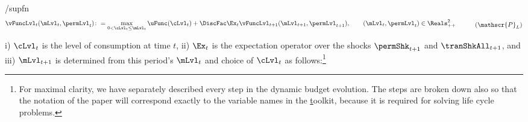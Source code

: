 \documentclass[\econtexRoot/BufferStockTheory]{subfiles}
\begin{document}
%
\begin{verbatimwrite}{\EqDir/supfn}
  \begin{equation}\begin{gathered}\begin{aligned}\label{eq:levelRecProblem}
    \vFuncLvl_{t}(\mLvl_{t}, \permLvl_{t})\colon & = \max_{0 < \cLvl_{t} \leq \mLvl_{t}} \uFunc(\cLvl_{t}) + \DiscFac \Ex_{t}\vFuncLvl_{t+1}(\mLvl_{t+1}, \permLvl_{t+1}), \qquad (\mLvl_{t}, \permLvl_{t})\in \Reals_{++}^{2} 
  \end{aligned}\end{gathered}
\tag{$\mathscr{P}_{L}$}
\end{equation}
\end{verbatimwrite} \unskip

 i) $\cLvl_{t}$ is the level of consumption at time $t$, ii) $\Ex_{t}$ is the expectation operator over the shocks $\permShk_{t+1}$ and $\tranShkAll_{t+1}$\hypertarget{checkRestrictions}{}\hypertarget{DBCparts}{}, and iii) $\mLvl_{t+1}$ is determined from this period's $\mLvl_{t}$ and choice of $\cLvl_{t}$ as follows:\footnote{For maximal clarity, we have separately described every step in the dynamic budget evolution.
The steps are broken down also so that the notation of the paper will correspond exactly to the variable names in the \href{https://github.com/econ-ark/HARK} toolkit, because it is required for solving life cycle problems.}%
%
\end{document}
